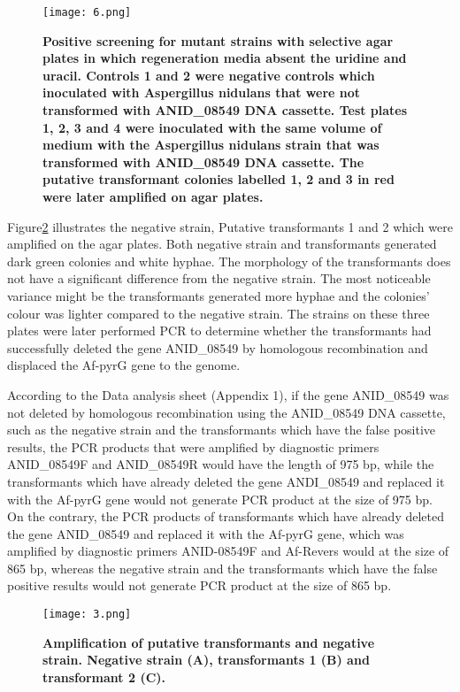 \documentclass[a4paper,10pt]{article}
\begin{document}
\begin{multicols}{2}
\begin{figure}[H]
\centering
\texttt{[image: 6.png]}
\caption{\scriptsize \textbf{Positive screening for mutant strains with selective agar plates in which regeneration media absent the uridine and uracil. Controls 1 and 2 were negative controls which inoculated with Aspergillus nidulans that were not transformed with ANID\_08549 DNA cassette. Test plates 1, 2, 3 and 4 were inoculated with the same volume of medium with the Aspergillus nidulans strain that was transformed with ANID\_08549 DNA cassette. The putative transformant colonies labelled 1, 2 and 3 in red were later amplified on agar plates. }}
\label{fig1}
\end{figure}


Figure\ref{fig2} illustrates the negative strain, Putative transformants 1 and 2 which were amplified on the agar plates. Both negative strain and transformants generated dark green colonies and white hyphae. The morphology of the transformants does not have a significant difference from the negative strain. The most noticeable variance might be the transformants generated more hyphae and the colonies’ colour was lighter compared to the negative strain. The strains on these three plates were later performed PCR to determine whether the transformants had successfully deleted the gene ANID\_08549 by homologous recombination and displaced the Af-pyrG gene to the genome.


According to the Data analysis sheet (Appendix 1), if the gene ANID\_08549 was not deleted by homologous recombination using the ANID\_08549 DNA cassette, such as the negative strain and the transformants which have the false positive results, the PCR products that were amplified by diagnostic primers ANID\_08549F and ANID\_08549R would have the length of 975 bp, while the transformants which have already deleted the gene ANDI\_08549 and replaced it with the Af-pyrG gene would not generate PCR product at the size of 975 bp. On the contrary, the PCR products of transformants which have already deleted the gene ANID\_08549 and replaced it with the Af-pyrG gene, which was amplified by diagnostic primers ANID-08549F and Af-Revers would at the size of 865 bp, whereas the negative strain and the transformants which have the false positive results would not generate PCR product at the size of 865 bp.


\begin{figure}[H]
\centering
\texttt{[image: 3.png]}
\caption{\scriptsize \textbf{Amplification of putative transformants and negative strain. Negative strain (A), transformants 1 (B) and transformant 2 (C).}}
\label{fig2}
\end{figure}



\end{multicols}
\end{document}
